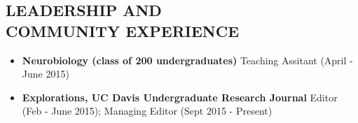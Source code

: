 \documentclass[line,margin,10pt]{res}
\begin{document}
\begin{resume}
 
                    
 \section{LEADERSHIP AND\\ COMMUNITY EXPERIENCE}
 \begin{itemize}[leftmargin=-2pt]\itemsep -2pt
\item[] \textbf {Neurobiology (class of 200 undergraduates)} Teaching Assitant (April - June 2015)
\item[] \textbf{Explorations, UC Davis Undergraduate Research Journal} Editor (Feb - June 2015); Managing Editor (Sept 2015 - Present)


\end{itemize}
\end{resume}
\end{document}
